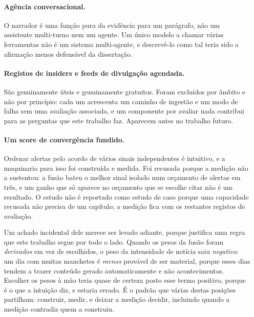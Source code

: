 \paragraph{Agência conversacional.} O narrador é uma função pura da evidência para um parágrafo, não
um assistente multi-turno nem um agente. Um único modelo a chamar várias ferramentas não é um
sistema multi-agente, e descrevê-lo como tal teria sido a afirmação menos defensável da dissertação.

\paragraph{Registos de insiders e feeds de divulgação agendada.} São genuinamente úteis e
genuinamente gratuitos. Foram excluídos por âmbito e não por princípio: cada um acrescenta um
caminho de ingestão e um modo de falha sem uma avaliação associada, e um componente por avaliar nada
contribui para as perguntas que este trabalho faz. Aparecem antes no trabalho futuro.

\paragraph{Um score de convergência fundido.} Ordenar alertas pelo acordo de vários sinais
independentes é intuitivo, e a maquinaria para isso foi construída e medida. Foi recusada porque a
medição não a sustentou: a fusão bateu o melhor sinal isolado num orçamento de alertas em três, e um
ganho que só aparece no orçamento que se escolhe citar não é um resultado. O estudo não é reportado
como estudo de caso porque uma capacidade recusada não precisa de um capítulo; a medição fica com os
restantes registos de avaliação.

Um achado incidental dele merece ser levado adiante, porque justifica uma regra que este trabalho
segue por todo o lado. Quando os pesos da fusão foram \emph{derivados} em vez de escolhidos, o peso
da intensidade de notícia saiu \emph{negativo}: um dia com muitas manchetes é \emph{menos} provável
de ser material, porque esses dias tendem a trazer conteúdo gerado automaticamente e não
acontecimentos. Escolher os pesos à mão teria quase de certeza posto esse termo positivo, porque é o
que a intuição diz, e estaria errado. É o padrão que várias destas posições partilham: construir,
medir, e deixar a medição decidir, incluindo quando a medição contradiz quem a construiu.


